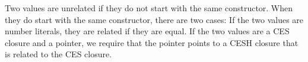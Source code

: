 \documentclass{article}
\theoremstyle{definition}
\newcommand{\Conid}[1]{\mathit{#1}}
\newcommand{\Varid}[1]{\mathit{#1}}
\def\resethooks{\global\let\SaveRestoreHook\empty
  \global\let\ColumnHook\empty}
\let\hspost\empty
\renewcommand\Varid[1]{\mathord{\textsf{#1}}}
\let\Conid\Varid
\newcommand\MyConid[1]{\mathord{\textsf{\textbf{#1}}}}
\renewcommand\Varid[1]{\textsf{#1}}
\begin{document}
\begin{comment}
\begin{hscode}\SaveRestoreHook
\column{B}{@{}>{\hspre}l<{\hspost}@{}}\column{17}{@{}>{\hspre}l<{\hspost}@{}}\column{E}{@{}>{\hspre}l<{\hspost}@{}}\>[B]{}\Varid{lookup-ptr}_{\Varid{cl}}\;\mathbin{:}\;{}\<[17]\>[17]{}\Conid{ClosHeap}\;\Varid{→}\;\Conid{ClosPtr}\;\Varid{→}\;{}\<[E]\\
\>[17]{}(\Conid{CESH.Closure}\;\Varid{→}\;\star)\;\Varid{→}\;\star{}\<[E]\\
\>[B]{}\Varid{lookup-ptr}_{\Varid{cl}}\;\Varid{h}\;\Varid{ptr}\;\Conid{P}\;\mathrel{=}\;\Varid{∃}\;\Varid{λ}\;\Varid{c}\;\Varid{→}\;\Varid{h}\;\mathbin{!}\;\Varid{ptr}\;\Varid{≡}\;\MyConid{just}\;\Varid{c}\;\Varid{×}\;\Conid{P}\;\Varid{c}{}\<[E]\\
\>[B]{}\Varid{lookup-clptr-fmap}\;\mathbin{:}\;\Varid{∀}\;\Varid{h}\;\Varid{ptr}\;\{\mskip1.5mu \Conid{P}\;\Conid{Q}\mskip1.5mu\}\;\Varid{→}\;(\Varid{∀}\;\{\mskip1.5mu \Varid{c}\mskip1.5mu\}\;\Varid{→}\;\Conid{P}\;\Varid{c}\;\Varid{→}\;\Conid{Q}\;\Varid{c})\;\Varid{→}\;\Varid{lookup-ptr}_{\Varid{cl}}\;\Varid{h}\;\Varid{ptr}\;\Conid{P}\;\Varid{→}\;\Varid{lookup-ptr}_{\Varid{cl}}\;\Varid{h}\;\Varid{ptr}\;\Conid{Q}{}\<[E]\\
\>[B]{}\Varid{lookup-clptr-fmap}\;\Varid{hs}\;\Varid{ptr}\;\Varid{f}\;(\Varid{c},\Varid{lucl},\Conid{Pcs})\;\mathrel{=}\;\Varid{c},\Varid{lucl},\Varid{f}\;\Conid{Pcs}{}\<[E]\ColumnHook
\end{hscode}\resethooks
\end{comment}
Two values are unrelated  if
they do not start with the same constructor.  When they do start with
the same constructor, there are two cases: If the two values are
number literals, they are related if they are equal. If the two values
are a CES closure and a pointer, we require that the pointer points to
a CESH closure that is related to the CES closure.
\end{document}
